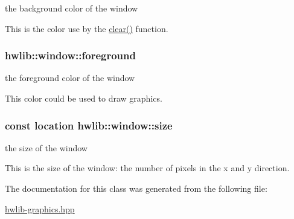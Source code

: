the background color of the window 

This is the color use by the \hyperlink{classhwlib_1_1window_a5e781163353ce26cb4dc5b2cbe40ad05}{clear()} function. 
\subsubsection[{\texorpdfstring{foreground}{foreground}}]{ hwlib\+::window\+::foreground}\hypertarget{classhwlib_1_1window_a812e3bf440309bf3280d34fa04eeb718}{}\label{classhwlib_1_1window_a812e3bf440309bf3280d34fa04eeb718}


the foreground color of the window 

This color could be used to draw graphics. 
\subsubsection[{\texorpdfstring{size}{size}}]{\setlength{\rightskip}{0pt plus 5cm}const {\bf location} hwlib\+::window\+::size}\hypertarget{classhwlib_1_1window_ad2ad5281c9c09d18010b19cb807d3eaa}{}\label{classhwlib_1_1window_ad2ad5281c9c09d18010b19cb807d3eaa}


the size of the window 

This is the size of the window\+: the number of pixels in the x and y direction. 

The documentation for this class was generated from the following file\+:\begin{DoxyCompactItemize}
\item 
\hyperlink{hwlib-graphics_8hpp}{hwlib-\/graphics.\+hpp}\end{DoxyCompactItemize}

